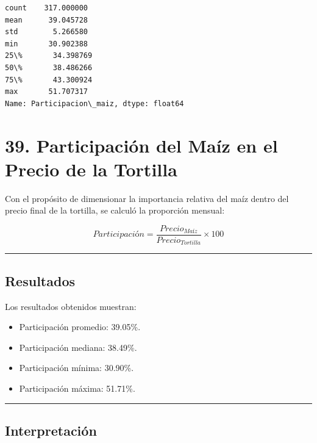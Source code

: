 \documentclass[11pt]{article}
\makeatletter
\providecommand{\tightlist}{%
      \setlength{\itemsep}{0pt}\setlength{\parskip}{0pt}}
\newcommand{\boxspacing}{\kern\kvtcb@left@rule\kern\kvtcb@boxsep}
\newcommand{\prompt}[4]{
        {\ttfamily\llap{{\color{#2}[#3]:\hspace{3pt}#4}}\vspace{-\baselineskip}}
    }
\makeatother
\begin{document}
            \begin{tcolorbox}[breakable, size=fbox, boxrule=.5pt, pad at break*=1mm, opacityfill=0]
\prompt{Out}{outcolor}{145}{\boxspacing}
\begin{Verbatim}[commandchars=\\\{\}]
count    317.000000
mean      39.045728
std        5.266580
min       30.902388
25\%       34.398769
50\%       38.486266
75\%       43.300924
max       51.707317
Name: Participacion\_maiz, dtype: float64
\end{Verbatim}
\end{tcolorbox}
        
    \hypertarget{participaciuxf3n-del-mauxedz-en-el-precio-de-la-tortilla}{%
\section{39. Participación del Maíz en el Precio de la
Tortilla}\label{participaciuxf3n-del-mauxedz-en-el-precio-de-la-tortilla}}

Con el propósito de dimensionar la importancia relativa del maíz dentro
del precio final de la tortilla, se calculó la proporción mensual:

\[
Participación=
\frac{Precio_{Maíz}}
{Precio_{Tortilla}}
\times100
\]

\begin{center}\rule{0.5\linewidth}{0.5pt}\end{center}

\hypertarget{resultados}{%
\subsection{Resultados}\label{resultados}}

Los resultados obtenidos muestran:

\begin{itemize}
\tightlist
\item
  Participación promedio: 39.05\%.
\item
  Participación mediana: 38.49\%.
\item
  Participación mínima: 30.90\%.
\item
  Participación máxima: 51.71\%.
\end{itemize}

\begin{center}\rule{0.5\linewidth}{0.5pt}\end{center}

\hypertarget{interpretaciuxf3n}{%
\subsection{Interpretación}\label{interpretaciuxf3n}}
\end{document}
